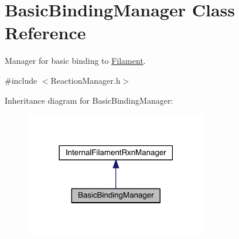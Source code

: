 \hypertarget{classBasicBindingManager}{\section{Basic\+Binding\+Manager Class Reference}
\label{classBasicBindingManager}
}


Manager for basic binding to \hyperlink{classFilament}{Filament}.  




{\ttfamily \#include $<$Reaction\+Manager.\+h$>$}



Inheritance diagram for Basic\+Binding\+Manager\+:\nopagebreak
\begin{figure}[H]
\begin{center}
\leavevmode
\includegraphics[width=225pt]{classBasicBindingManager__inherit__graph}
\end{center}
\end{figure}


